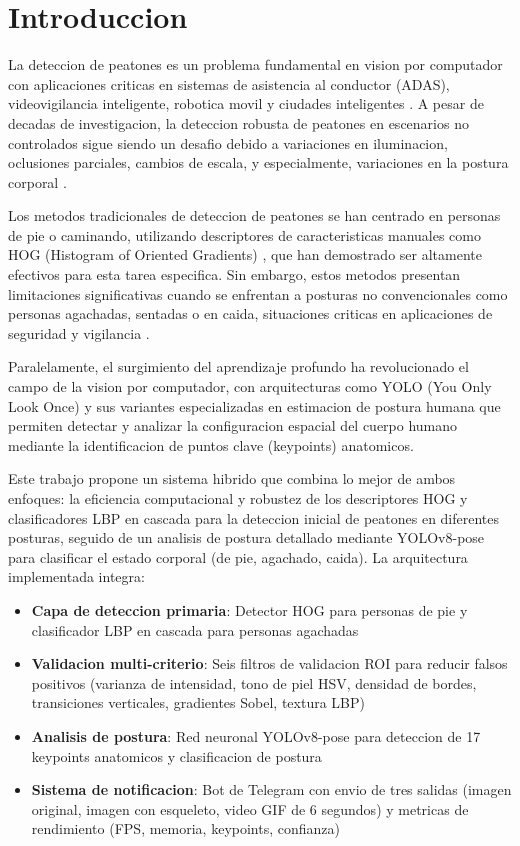 \documentclass[conference]{IEEEtran}
\begin{document}
\section{Introduccion}

La deteccion de peatones es un problema fundamental en vision por computador con aplicaciones criticas en sistemas de asistencia al conductor (ADAS), videovigilancia inteligente, robotica movil y ciudades inteligentes \cite{dalal2005histograms, dollar2012pedestrian}. A pesar de decadas de investigacion, la deteccion robusta de peatones en escenarios no controlados sigue siendo un desafio debido a variaciones en iluminacion, oclusiones parciales, cambios de escala, y especialmente, variaciones en la postura corporal \cite{zhang2016far, benenson2014ten}.

Los metodos tradicionales de deteccion de peatones se han centrado en personas de pie o caminando, utilizando descriptores de caracteristicas manuales como HOG (Histogram of Oriented Gradients) \cite{dalal2005histograms}, que han demostrado ser altamente efectivos para esta tarea especifica. Sin embargo, estos metodos presentan limitaciones significativas cuando se enfrentan a posturas no convencionales como personas agachadas, sentadas o en caida, situaciones criticas en aplicaciones de seguridad y vigilancia \cite{enzweiler2009monocular}.

Paralelamente, el surgimiento del aprendizaje profundo ha revolucionado el campo de la vision por computador, con arquitecturas como YOLO (You Only Look Once) \cite{redmon2016you, redmon2017yolo9000} y sus variantes especializadas en estimacion de postura humana \cite{toshev2014deeppose, cao2017realtime} que permiten detectar y analizar la configuracion espacial del cuerpo humano mediante la identificacion de puntos clave (keypoints) anatomicos.

Este trabajo propone un sistema hibrido que combina lo mejor de ambos enfoques: la eficiencia computacional y robustez de los descriptores HOG y clasificadores LBP en cascada para la deteccion inicial de peatones en diferentes posturas, seguido de un analisis de postura detallado mediante YOLOv8-pose \cite{ultralytics2023yolov8} para clasificar el estado corporal (de pie, agachado, caida). La arquitectura implementada integra:

\begin{itemize}
    \item \textbf{Capa de deteccion primaria}: Detector HOG para personas de pie y clasificador LBP en cascada para personas agachadas
    \item \textbf{Validacion multi-criterio}: Seis filtros de validacion ROI para reducir falsos positivos (varianza de intensidad, tono de piel HSV, densidad de bordes, transiciones verticales, gradientes Sobel, textura LBP)
    \item \textbf{Analisis de postura}: Red neuronal YOLOv8-pose para deteccion de 17 keypoints anatomicos y clasificacion de postura
    \item \textbf{Sistema de notificacion}: Bot de Telegram con envio de tres salidas (imagen original, imagen con esqueleto, video GIF de 6 segundos) y metricas de rendimiento (FPS, memoria, keypoints, confianza)
\end{itemize}
\end{document}
